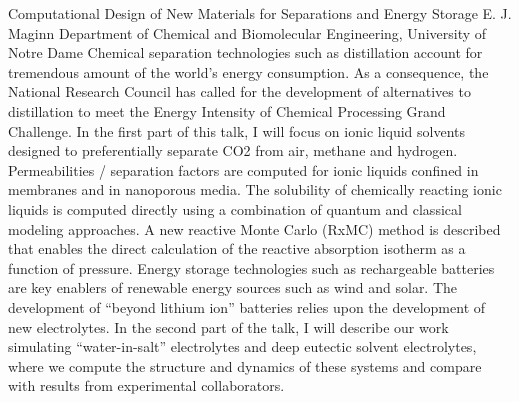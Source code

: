 
    \begin{abstract_online}{Computational Design of New Materials for Separations and Energy Storage}{%
        E. J. Maginn}{%
        \KLtag}{%
        Department of Chemical and Biomolecular Engineering, University of Notre Dame}
    Chemical separation technologies such as distillation account for tremendous amount of the world’s energy consumption. As a consequence, the National Research Council has called for the development of alternatives to distillation to meet the Energy Intensity of Chemical Processing Grand Challenge. In the first part of this talk, I will focus on ionic liquid solvents designed to preferentially separate CO2 from air, methane and hydrogen. Permeabilities / separation factors are computed for ionic liquids confined in membranes and in nanoporous media. The solubility of chemically reacting ionic liquids is computed directly using a combination of quantum and classical modeling approaches. A new reactive Monte Carlo (RxMC) method is described that enables the direct calculation of the reactive absorption isotherm as a function of pressure. Energy storage technologies such as rechargeable batteries are key enablers of renewable energy sources such as wind and solar. The development of “beyond lithium ion” batteries relies upon the development of new electrolytes. In the second part of the talk, I will describe our work simulating “water-in-salt” electrolytes and deep eutectic solvent electrolytes, where we compute the structure and dynamics of these systems and compare with results from experimental collaborators. 
    
    \end{abstract_online}
    
